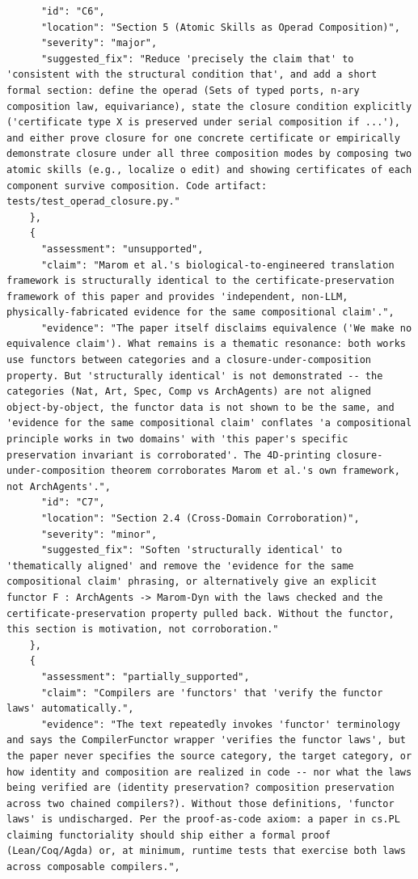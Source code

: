 \documentclass[11pt]{article}
\begin{document}
\begin{verbatim}
      "id": "C6",
      "location": "Section 5 (Atomic Skills as Operad Composition)",
      "severity": "major",
      "suggested_fix": "Reduce 'precisely the claim that' to 'consistent with the structural condition that', and add a short formal section: define the operad (Sets of typed ports, n-ary composition law, equivariance), state the closure condition explicitly ('certificate type X is preserved under serial composition if ...'), and either prove closure for one concrete certificate or empirically demonstrate closure under all three composition modes by composing two atomic skills (e.g., localize o edit) and showing certificates of each component survive composition. Code artifact: tests/test_operad_closure.py."
    },
    {
      "assessment": "unsupported",
      "claim": "Marom et al.'s biological-to-engineered translation framework is structurally identical to the certificate-preservation framework of this paper and provides 'independent, non-LLM, physically-fabricated evidence for the same compositional claim'.",
      "evidence": "The paper itself disclaims equivalence ('We make no equivalence claim'). What remains is a thematic resonance: both works use functors between categories and a closure-under-composition property. But 'structurally identical' is not demonstrated -- the categories (Nat, Art, Spec, Comp vs ArchAgents) are not aligned object-by-object, the functor data is not shown to be the same, and 'evidence for the same compositional claim' conflates 'a compositional principle works in two domains' with 'this paper's specific preservation invariant is corroborated'. The 4D-printing closure-under-composition theorem corroborates Marom et al.'s own framework, not ArchAgents'.",
      "id": "C7",
      "location": "Section 2.4 (Cross-Domain Corroboration)",
      "severity": "minor",
      "suggested_fix": "Soften 'structurally identical' to 'thematically aligned' and remove the 'evidence for the same compositional claim' phrasing, or alternatively give an explicit functor F : ArchAgents -> Marom-Dyn with the laws checked and the certificate-preservation property pulled back. Without the functor, this section is motivation, not corroboration."
    },
    {
      "assessment": "partially_supported",
      "claim": "Compilers are 'functors' that 'verify the functor laws' automatically.",
      "evidence": "The text repeatedly invokes 'functor' terminology and says the CompilerFunctor wrapper 'verifies the functor laws', but the paper never specifies the source category, the target category, or how identity and composition are realized in code -- nor what the laws being verified are (identity preservation? composition preservation across two chained compilers?). Without those definitions, 'functor laws' is undischarged. Per the proof-as-code axiom: a paper in cs.PL claiming functoriality should ship either a formal proof (Lean/Coq/Agda) or, at minimum, runtime tests that exercise both laws across composable compilers.",

\end{verbatim}
\end{document}
